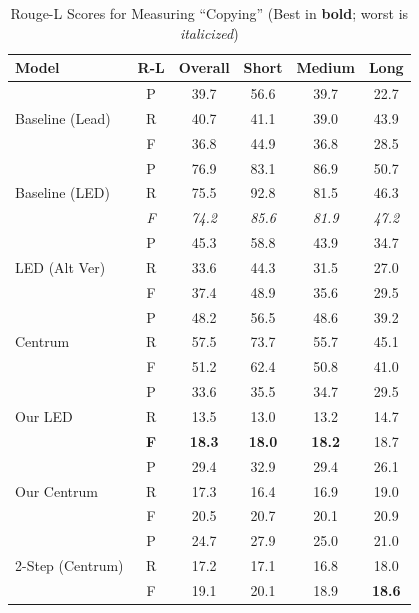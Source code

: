 \documentclass[12pt, twocolumn]{article}
\numberwithin{equation}{section}
\begin{document}
\begin{table}
    \centering
    \footnotesize
    \begin{tabular}{|p{1.5cm}|c|c|c|c|c|}
    \hline
        Model & R-L & Overall & Short & Medium & Long \\ \hline
        \multirow{3}{1.5cm}{Baseline (Lead)} 
	& P & 39.7 & 56.6 & 39.7 & 22.7 \\ \cline{2-6}
        & R & 40.7 & 41.1 & 39.0 & 43.9 \\ \cline{2-6}
        & F & 36.8 & 44.9 & 36.8 & 28.5 \\ \hline
        \multirow{3}{1.5cm}{Baseline (LED)} 
	& P & 76.9 & 83.1 & 86.9 & 50.7 \\ \cline{2-6}
        & R & 75.5 & 92.8 & 81.5 & 46.3 \\ \cline{2-6}
        & \textit{F} & \textit{74.2} & \textit{85.6} & \textit{81.9} & \textit{47.2} \\ \hline
        \multirow{3}{1.5cm}{LED (Alt Ver)} 
	& P & 45.3 & 58.8 & 43.9 & 34.7 \\ \cline{2-6}
        & R & 33.6 & 44.3 & 31.5 & 27.0 \\ \cline{2-6}
        & F & 37.4 & 48.9 & 35.6 & 29.5 \\ \hline
        \multirow{3}{1.5cm}{Centrum} 
	& P & 48.2 & 56.5 & 48.6 & 39.2 \\ \cline{2-6}
        & R & 57.5 & 73.7 & 55.7 & 45.1 \\ \cline{2-6}
        & F & 51.2 & 62.4 & 50.8 & 41.0 \\ \hline
        \multirow{3}{1.5cm}{Our LED} 
	& P & 33.6 & 35.5 & 34.7 & 29.5 \\ \cline{2-6}
        & R & 13.5 & 13.0 & 13.2 & 14.7 \\ \cline{2-6}
        & \textbf{F} & \textbf{18.3} & \textbf{18.0} & \textbf{18.2} & 18.7 \\ \hline
        \multirow{3}{1.5cm}{Our Centrum} 
	& P & 29.4 & 32.9 & 29.4 & 26.1 \\ \cline{2-6}
        & R & 17.3 & 16.4 & 16.9 & 19.0 \\ \cline{2-6}
        & F & 20.5 & 20.7 & 20.1 & 20.9 \\ \hline
        \multirow{3}{1.5cm}{2-Step (Centrum)} 
	& P & 24.7 & 27.9 & 25.0 & 21.0 \\ \cline{2-6}
        & R & 17.2 & 17.1 & 16.8 & 18.0 \\ \cline{2-6}
        & F & 19.1 & 20.1 & 18.9 & \textbf{18.6} \\ \hline
    \end{tabular}
    \caption{Rouge-L Scores for Measuring ``Copying'' (Best in \textbf{bold}; worst is \textit{italicized})}
    \label{tab:rouge-l-copy}
\end{table}
\end{document}
